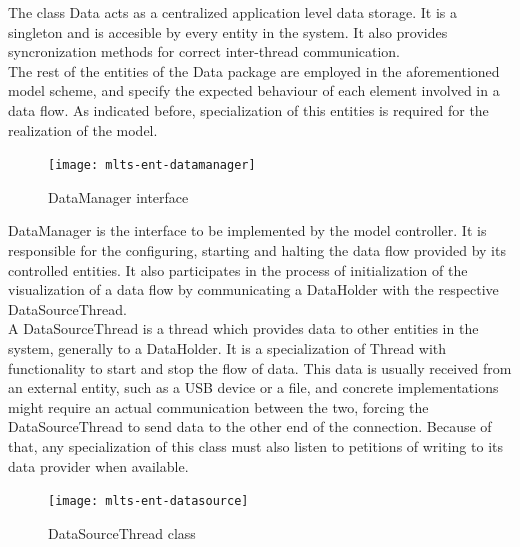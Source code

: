		The class Data acts as a centralized application level data storage. It is a singleton and is accesible by every entity in the system. It also provides syncronization methods for correct inter-thread communication.\\

		The rest of the entities of the Data package are employed in the aforementioned model scheme, and specify the expected behaviour of each element involved in a data flow. As indicated before, specialization of this entities is required for the realization of the model.\\

		\begin{figure}[h]
		\begin{center}
	    	\texttt{[image: mlts-ent-datamanager]}
  		\end{center}
  		\caption{DataManager interface}
		\end{figure}


		DataManager is the interface to be implemented by the model controller. It is responsible for the configuring, starting and halting the data flow provided by its controlled entities. It also participates in the process of initialization of the visualization  of a data flow by communicating a DataHolder with the respective DataSourceThread.\\

		A DataSourceThread is a thread which provides data to other entities in the system, generally to a DataHolder. It is a specialization of Thread with functionality to start and stop the flow of data. This data is usually received from an external entity, such as a USB device or a file, and concrete implementations  might require an actual communication between the two, forcing the DataSourceThread to send data to the other end of the connection. Because of that, any specialization of this class must also listen to petitions of writing to its data provider when available.\\

		\begin{figure}[h]
		\begin{center}
	    	\texttt{[image: mlts-ent-datasource]}
  		\end{center}
  		\caption{DataSourceThread class}
		\end{figure}

